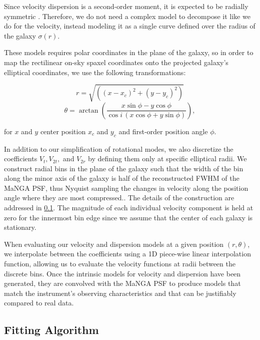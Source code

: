 \noindent Since velocity dispersion is a second-order moment, it is expected to be radially symmetric \cite{binney08}. Therefore, we do not need a complex model to decompose it like we do for the velocity, instead modeling it as a single curve defined over the radius of the galaxy $\sigma(r)$.

These models requires polar coordinates in the plane of the galaxy, so in order to map the rectilinear on-sky spaxel coordinates onto the projected galaxy's elliptical coordinates, we use the following transformations:

\begin{equation}
    r = \sqrt{((x - x_c)^2 + (y - y_c)^2)}
\end{equation}
\begin{equation}
    \theta = \arctan\left(\frac{x \sin \phi - y \cos \phi}{\cos i\, (x \cos \phi + y \sin \phi)}\right),
\end{equation}

\noindent for $x$ and $y$ center position $x_c$ and $y_c$ and first-order position angle $\phi$. 

In addition to our simplification of rotational modes, we also discretize the coefficients $V_t, V_{2t},$ and $V_{2r}$ by defining them only at specific elliptical radii. We construct radial bins in the plane of the galaxy such that the width of the bin along the minor axis of the galaxy is half of the reconstructed FWHM of the MaNGA PSF, thus Nyquist sampling the changes in velocity along the position angle where they are most compressed.. The details of the construction are addressed in \ref{sec:fitting}. The magnitude of each individual velocity component is held at zero for the innermost bin edge since we assume that the center of each galaxy is stationary. 

When evaluating our velocity and dispersion models at a given position $(r, \theta)$, we interpolate between the coefficients using a 1D piece-wise linear interpolation function, allowing us to evaluate the velocity functions at radii between the discrete bins. Once the intrinsic models for velocity and dispersion have been generated, they are convolved with the MaNGA PSF to produce models that match the instrument's observing characteristics and that can be justifiably compared to real data.


\subsection{Fitting Algorithm} \label{sec:fitting}


